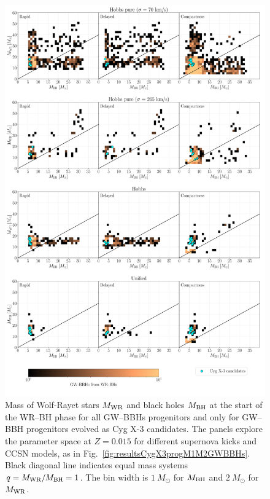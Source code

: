\documentclass[a4paper,titlepage]{book}     	%
\newcommand{\sun}{\ensuremath{_\odot}}
\newcommand{\msun}{\ensuremath{M\sun}}
\newcommand{\mwr}{\ensuremath{M_\textup{WR}}}
\newcommand{\mbh}{\ensuremath{M_\textup{BH}}}
\begin{document}
\begin{figure}[h!]
	\centering
	\includegraphics[width=\textwidth]{./images/kickcompare_MWRMBH_015.pdf}	
	\caption{Mass of Wolf-Rayet stars $M_{\rm WR}$ and black holes $M_{\rm BH}$ at the start of the WR--BH phase for all GW--BBHs progenitors and only for GW--BBH progenitors evolved as Cyg X-3 candidates. The panels explore the parameter space at $Z=0.015$ for different supernova kicks and CCSN models, as in Fig.\ \ref{fig:resultsCygX3progM1M2GWBBHs}. Black diagonal line indicates equal mass systems $q=\mwr/\mbh = 1$. The bin width is $1~\msun$ for $M_{\rm BH}$ and $2~\msun$ for $M_{\rm WR}$. }\label{fig:resultsCygX3WRBHphaseGWBBHs}
\end{figure}
\end{document}
